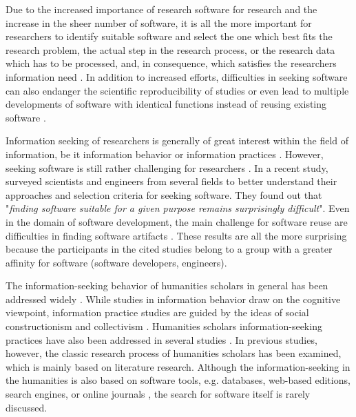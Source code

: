 \documentclass[12pt, a4paper, titlepage, oneside, abstract=true, toc=listof, toc=bibliography, BCOR=1cm]{scrreprt}
\begin{document}
Due to the increased importance of research software for research \citep{Katz2017} and the increase in the sheer number of software, it is all the more important for researchers to identify suitable software and select the one which best fits the research problem, the actual step in the research process, or the research data which has to be processed, and, in consequence, which satisfies the researchers information need \citep{Wilson1994}. In addition to increased efforts, difficulties in seeking software can also endanger the scientific reproducibility of studies or even lead to multiple developments of software with identical functions instead of reusing existing software \citep{Hucka2018}.

Information seeking of researchers is generally of great interest within the field of information, be it information behavior \citep[e.g.][]{Ahmadianyazdi2018, Barrett2005, Campbell2017, Catalano2013, Ellis1993, Hemminger2007, Korobili2011,  Liyana2017, Rimmer2006, RuppSerrano2013, Wang2008} or information practices \citep[e.g.][]{Boyum2015, Bulger2011, Fry2006, Given2018, Roos2015}. However, seeking software is still rather challenging for researchers \citep{Howison2015}. In a recent study, \citet{Hucka2018} surveyed scientists and engineers from several fields to better understand their approaches and selection criteria for seeking software. They found out that "\textit{finding software suitable for a given purpose remains surprisingly difficult}". Even in the domain of software development, the main challenge for software reuse are difficulties in finding software artifacts \citep{Bauer2014, Grossman2009}. These results are all the more surprising because the participants in the cited studies belong to a group with a greater affinity for software (software developers, engineers).

The information-seeking behavior of humanities scholars in general has been addressed widely \citep[e.g.][]{Barrett2005, Bronstein2007, Bronstein2007a, Catalano2013, Ellis1993, Given2018, Korobili2011, Liew2006, Rimmer2006}. While studies in information behavior draw on the cognitive viewpoint, information practice studies are guided by the ideas of social constructionism and collectivism \citep{Savolainen2007, Talja2005, Talja2007}. Humanities scholars information-seeking practices have also been addressed in several studies \citep{Benardou2013, Bulger2011, Given2018, Palmer2009}. In previous studies, however, the classic research process of humanities scholars has been examined, which is mainly based on literature research. Although the information-seeking in the humanities is also based on software tools, e.g. databases, web-based editions, search engines, or online journals \citep{Barrett2005, Rimmer2006}, the search for software itself is rarely discussed. 
\end{document}
